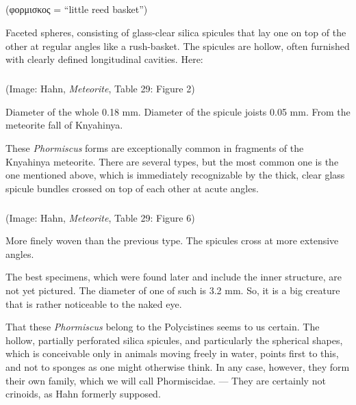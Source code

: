 \documentclass[a4paper, 12pt, oneside]{article}
\begin{document}
\subsection{}
\subsubsection{}
\paragraph*{}
(φορμισκος = ``little reed basket'')%

Faceted spheres, consisting of glass-clear silica spicules that lay one on top of the other at regular angles like a rush-basket. The spicules are hollow, often furnished with clearly defined longitudinal cavities. Here:
\paragraph{\large{}}
\subparagraph{}
(Image: Hahn, \emph{Meteorite}, Table 29: Figure 2)

Diameter of the whole 0.18 mm. Diameter of the spicule joists 0.05 mm. From the meteorite fall of Knyahinya.

These \emph{Phormiscus} forms are exceptionally common in fragments of the Knyahinya meteorite. There are several types, but the most common one is the one mentioned above, which is immediately recognizable by the thick, clear glass spicule bundles crossed on top of each other at acute angles.
\paragraph{\large{}}
\subparagraph{}
(Image: Hahn, \emph{Meteorite}, Table 29: Figure 6)

More finely woven than the previous type. The spicules cross at more extensive angles.

The best specimens, which were found later and include the inner structure, are not yet pictured. The diameter of one of such is 3.2 mm. So, it is a big creature that is rather noticeable to the naked eye.

That these \emph{Phormiscus} belong to the Polycistines seems to us certain. The hollow, partially perforated silica spicules, and particularly the spherical shapes, which is conceivable only in animals moving freely in water, points first to this, and not to sponges as one might otherwise think. In any case, however, they form their own family, which we will call Phormiscidae. --- They are certainly not crinoids, as Hahn formerly supposed.
\end{document}

